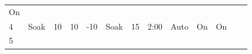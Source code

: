 \begin{longtable}[]{@{}lllllllllllll@{}}
\begin{minipage}[t]{0.03\columnwidth}
On\strut
\end{minipage} & \begin{minipage}[t]{0.07\columnwidth}\raggedright
\strut
\end{minipage} & \begin{minipage}[t]{0.08\columnwidth}\raggedright
\strut
\end{minipage}\tabularnewline
\begin{minipage}[t]{0.06\columnwidth}\raggedright
4\strut
\end{minipage} & \begin{minipage}[t]{0.06\columnwidth}\raggedright
Soak\strut
\end{minipage} & \begin{minipage}[t]{0.05\columnwidth}\raggedright
10\strut
\end{minipage} & \begin{minipage}[t]{0.04\columnwidth}\raggedright
10\strut
\end{minipage} & \begin{minipage}[t]{0.04\columnwidth}\raggedright
-10\strut
\end{minipage} & \begin{minipage}[t]{0.06\columnwidth}\raggedright
Soak\strut
\end{minipage} & \begin{minipage}[t]{0.05\columnwidth}\raggedright
15\strut
\end{minipage} & \begin{minipage}[t]{0.05\columnwidth}\raggedright
2:00\strut
\end{minipage} & \begin{minipage}[t]{0.04\columnwidth}\raggedright
Auto\strut
\end{minipage} & \begin{minipage}[t]{0.03\columnwidth}\raggedright
On\strut
\end{minipage} & \begin{minipage}[t]{0.03\columnwidth}\raggedright
On\strut
\end{minipage} & \begin{minipage}[t]{0.07\columnwidth}\raggedright
\strut
\end{minipage} & \begin{minipage}[t]{0.08\columnwidth}\raggedright
\strut
\end{minipage}\tabularnewline
\begin{minipage}[t]{0.06\columnwidth}\raggedright
5\strut
\end{minipage} & \begin{minipage}[t]{0.06\columnwidth}\raggedright

\end{minipage}
\end{longtable}
